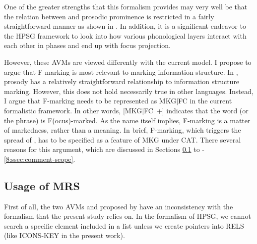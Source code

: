 

\noindent One of the greater strengths that this formalism provides
may very well be that the relation between  and prosodic
prominence is restricted in a fairly straightforward manner as shown
in . In addition, it is a
significant endeavor to the HPSG framework to look into how various
phonological layers interact with each other in phases and end up with
focus projection.


However, these AVMs are viewed differently with the current model.  I
propose to argue that F-marking is most relevant to marking
information structure. In , prosody has a
relatively straightforward relationship to information structure
marking. However, this does not hold necessarily true in other
languages.  Instead, I argue that F-marking needs to be represented as
MKG{$\mid$}FC in the current formalistic framework. In other words,
\mbox{[MKG{$\mid$}FC +]} indicates that the word (or the phrase) is
F(ocus)-marked. As the name itself implies, F-marking is a
matter of markedness, rather than a meaning. In brief, F-marking,
which triggers the spread of , has to be specified as a
feature of MKG under CAT. There several reasons for this argument,
which are discussed in Sections \ref{8:ssec:usage} to
-\ref{8:ssec:comment-scope}.



\subsection{Usage of MRS}
\label{8:ssec:usage}


First of all, the two AVMs
 and
 proposed by
\citet{bildhauer:07} have an inconsistency with the 
formalism that the present study relies on.  In the 
formalism of HPSG, we cannot search a specific element
included in a list unless we create pointers into RELS (like ICONS-KEY
in the present work).






